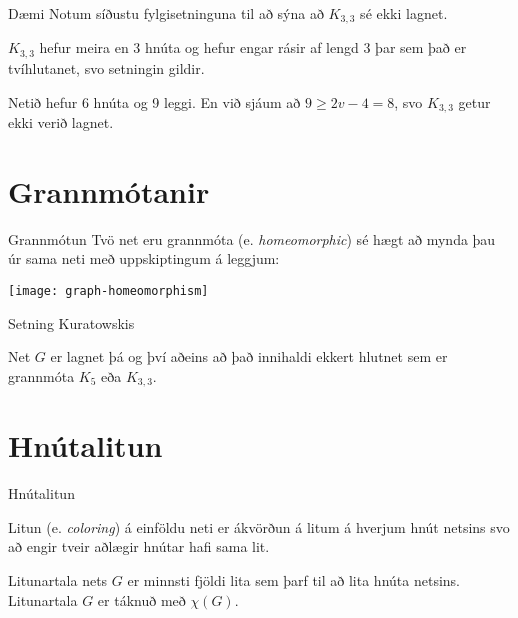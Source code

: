 \documentclass[handout]{beamer}
\begin{document}
\begin{frame}{Dæmi}
Notum síðustu fylgisetninguna til að sýna að $K_{3,3}$ sé ekki lagnet. \pause

\vspace{1cm}
$K_{3,3}$ hefur meira en 3 hnúta og hefur engar rásir af lengd $3$ þar sem það er tvíhlutanet, svo setningin gildir.

Netið hefur 6 hnúta og 9 leggi. En við sjáum að $9 \geq 2v - 4 = 8$, svo $K_{3, 3}$ getur ekki verið lagnet.
\end{frame}

\section{Grannmótanir}

\begin{frame}{Grannmótun}
Tvö net eru grannmóta (e. \emph{homeomorphic}) sé hægt að mynda þau úr sama neti með uppskiptingum á leggjum:
\begin{center}
\texttt{[image: graph-homeomorphism]}
\end{center}
\end{frame}

\begin{frame}{Setning Kuratowskis}
\begin{tcolorbox}[title=Setning Kuratowskis]
Net $G$ er lagnet þá og því aðeins að það innihaldi ekkert hlutnet sem er grannmóta $K_5$ eða $K_{3,3}$.
\end{tcolorbox}

\end{frame}


\section{Hnútalitun}

\begin{frame}{Hnútalitun}
\begin{tcolorbox}[title=Litun]
Litun (e. \emph{coloring}) á einföldu neti er ákvörðun á litum á hverjum hnút netsins svo að engir tveir aðlægir hnútar hafi sama lit.
\end{tcolorbox}

\begin{tcolorbox}[title=Litunartala]
Litunartala nets $G$ er minnsti fjöldi lita sem þarf til að lita hnúta netsins. Litunartala $G$ er táknuð með $\chi(G)$.
\end{tcolorbox}

\end{frame}
\end{document}
